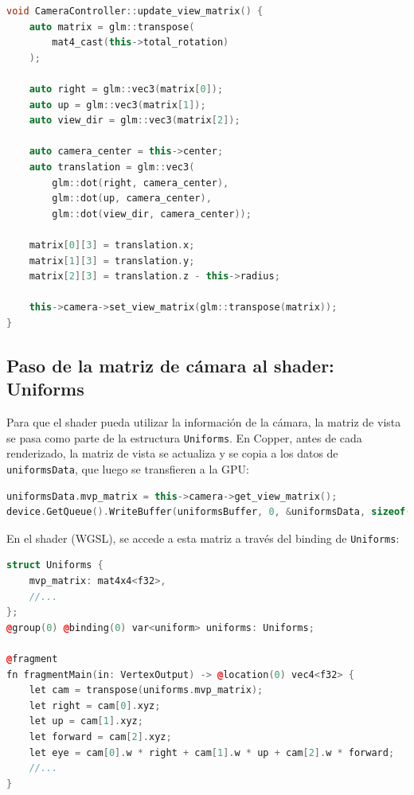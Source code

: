 \begin{lstlisting}[language=C++,caption={Actualización de la vista desde CameraController}]
void CameraController::update_view_matrix() {
    auto matrix = glm::transpose(
        mat4_cast(this->total_rotation)
    );

    auto right = glm::vec3(matrix[0]);
    auto up = glm::vec3(matrix[1]);
    auto view_dir = glm::vec3(matrix[2]);

    auto camera_center = this->center;
    auto translation = glm::vec3(
        glm::dot(right, camera_center),
        glm::dot(up, camera_center),
        glm::dot(view_dir, camera_center));

    matrix[0][3] = translation.x;
    matrix[1][3] = translation.y;
    matrix[2][3] = translation.z - this->radius;

    this->camera->set_view_matrix(glm::transpose(matrix));
}
\end{lstlisting}

\subsection{Paso de la matriz de cámara al shader: Uniforms}

Para que el shader pueda utilizar la información de la cámara, la matriz de
vista se pasa como parte de la estructura \texttt{Uniforms}. En Copper, antes
de cada renderizado, la matriz de vista se actualiza y se copia a los datos de
\texttt{uniformsData}, que luego se transfieren a la GPU:

\begin{lstlisting}[language=C++,caption={Actualización del uniform con la matriz de vista}]
uniformsData.mvp_matrix = this->camera->get_view_matrix();
device.GetQueue().WriteBuffer(uniformsBuffer, 0, &uniformsData, sizeof(Uniforms));
\end{lstlisting}

En el shader (WGSL), se accede a esta matriz a través del binding de
\texttt{Uniforms}:

\begin{lstlisting}[language=C++,caption={Uso de la matriz de cámara en el shader}]
struct Uniforms {
    mvp_matrix: mat4x4<f32>,
    //...
};
@group(0) @binding(0) var<uniform> uniforms: Uniforms;

@fragment
fn fragmentMain(in: VertexOutput) -> @location(0) vec4<f32> {
    let cam = transpose(uniforms.mvp_matrix);
    let right = cam[0].xyz;
    let up = cam[1].xyz;
    let forward = cam[2].xyz;
    let eye = cam[0].w * right + cam[1].w * up + cam[2].w * forward;
    //...
}
\end{lstlisting}

